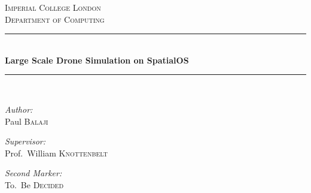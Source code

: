 \documentclass[12pt]{article}
\begin{document}
\begin{titlepage}

\newcommand{\HRule}{\rule{\linewidth}{0.5mm}} %
\setlength{\topmargin}{0in}
\center %



\textsc{\LARGE Imperial College London}\\[1.5cm] %
\textsc{\Large Department of Computing}\\[0.5cm] %


\HRule \\[0.4cm]
{ \huge \bfseries Large Scale Drone Simulation on SpatialOS}\\[0.4cm] %
\HRule \\[1cm]


\begin{minipage}[t]{0.4\textwidth}
\begin{flushleft} \large
\emph{Author:}\\
Paul \textsc{Balaji} \\
\end{flushleft}
\end{minipage}
\begin{minipage}[t]{0.5\textwidth}
\begin{flushright} \large
\emph{Supervisor:} \\
Prof.~William \textsc{Knottenbelt}
\end{flushright}
\begin{flushright} \large
\emph{Second Marker:} \\
To.~Be \textsc{Decided}
\end{flushright}
\end{minipage}\\[1cm]




\vfill %

\end{titlepage}
\end{document}
